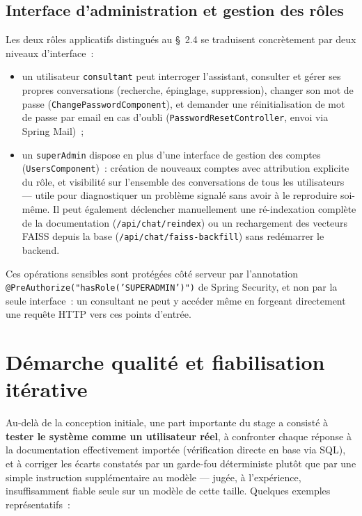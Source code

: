 ﻿\documentclass[12pt,a4paper]{report}
\newcommand{\code}[1]{\texttt{\color{biatbluedk}#1}}
\begin{document}
\section{Interface d'administration et gestion des rôles}
Les deux rôles applicatifs distingués au \S~2.4 se traduisent concrètement par deux niveaux d'interface~:
\begin{itemize}
  \item un utilisateur \code{consultant} peut interroger l'assistant, consulter et gérer ses propres conversations (recherche, épinglage, suppression), changer son mot de passe (\code{ChangePasswordComponent}), et demander une réinitialisation de mot de passe par email en cas d'oubli (\code{PasswordResetController}, envoi via Spring Mail)~;
  \item un \code{superAdmin} dispose en plus d'une interface de gestion des comptes (\code{UsersComponent})~: création de nouveaux comptes avec attribution explicite du rôle, et visibilité sur l'ensemble des conversations de tous les utilisateurs --- utile pour diagnostiquer un problème signalé sans avoir à le reproduire soi-même. Il peut également déclencher manuellement une ré-indexation complète de la documentation (\code{/api/chat/reindex}) ou un rechargement des vecteurs FAISS depuis la base (\code{/api/chat/faiss-backfill}) sans redémarrer le backend.
\end{itemize}
Ces opérations sensibles sont protégées côté serveur par l'annotation \code{@PreAuthorize("hasRole('SUPERADMIN')")} de Spring Security, et non par la seule interface~: un consultant ne peut y accéder même en forgeant directement une requête HTTP vers ces points d'entrée.

\chapter{Démarche qualité et fiabilisation itérative}
\label{ch:qualite}

Au-delà de la conception initiale, une part importante du stage a consisté à \textbf{tester le système comme un utilisateur réel}, à confronter chaque réponse à la documentation effectivement importée (vérification directe en base via SQL), et à corriger les écarts constatés par un garde-fou déterministe plutôt que par une simple instruction supplémentaire au modèle --- jugée, à l'expérience, insuffisamment fiable seule sur un modèle de cette taille. Quelques exemples représentatifs~:
\end{document}
